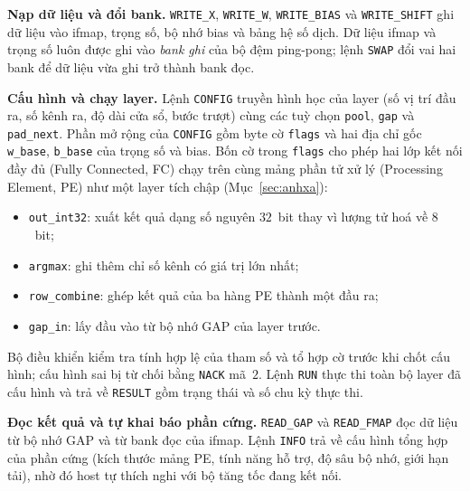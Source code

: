 \textbf{Nạp dữ liệu và đổi bank.}
\texttt{WRITE\_X}, \texttt{WRITE\_W}, \texttt{WRITE\_BIAS} và \texttt{WRITE\_SHIFT} ghi dữ liệu vào ifmap, trọng số, bộ nhớ bias và bảng hệ số dịch.
Dữ liệu ifmap và trọng số luôn được ghi vào \emph{bank ghi} của bộ đệm ping-pong; lệnh \texttt{SWAP} đổi vai hai bank để dữ liệu vừa ghi trở thành bank đọc.

\textbf{Cấu hình và chạy layer.}
Lệnh \texttt{CONFIG} truyền hình học của layer (số vị trí đầu ra, số kênh ra, độ dài cửa sổ, bước trượt) cùng các tuỳ chọn \texttt{pool}, \texttt{gap} và \texttt{pad\_next}.
Phần mở rộng của \texttt{CONFIG} gồm byte cờ \texttt{flags} và hai địa chỉ gốc \texttt{w\_base}, \texttt{b\_base} của trọng số và bias.
Bốn cờ trong \texttt{flags} cho phép hai lớp kết nối đầy đủ (Fully Connected, FC) chạy trên cùng mảng phần tử xử lý (Processing Element, PE) như một layer tích chập (Mục~\ref{sec:anhxa}):
\begin{itemize}
  \item \texttt{out\_int32}: xuất kết quả dạng số nguyên $32$~bit thay vì lượng tử hoá về $8$~bit;
  \item \texttt{argmax}: ghi thêm chỉ số kênh có giá trị lớn nhất;
  \item \texttt{row\_combine}: ghép kết quả của ba hàng PE thành một đầu ra;
  \item \texttt{gap\_in}: lấy đầu vào từ bộ nhớ GAP của layer trước.
\end{itemize}
Bộ điều khiển kiểm tra tính hợp lệ của tham số và tổ hợp cờ trước khi chốt cấu hình; cấu hình sai bị từ chối bằng \texttt{NACK} mã~$2$.
Lệnh \texttt{RUN} thực thi toàn bộ layer đã cấu hình và trả về \texttt{RESULT} gồm trạng thái và số chu kỳ thực thi.

\textbf{Đọc kết quả và tự khai báo phần cứng.}
\texttt{READ\_GAP} và \texttt{READ\_FMAP} đọc dữ liệu từ bộ nhớ GAP và từ bank đọc của ifmap.
Lệnh \texttt{INFO} trả về cấu hình tổng hợp của phần cứng (kích thước mảng PE, tính năng hỗ trợ, độ sâu bộ nhớ, giới hạn tải), nhờ đó host tự thích nghi với bộ tăng tốc đang kết nối.

